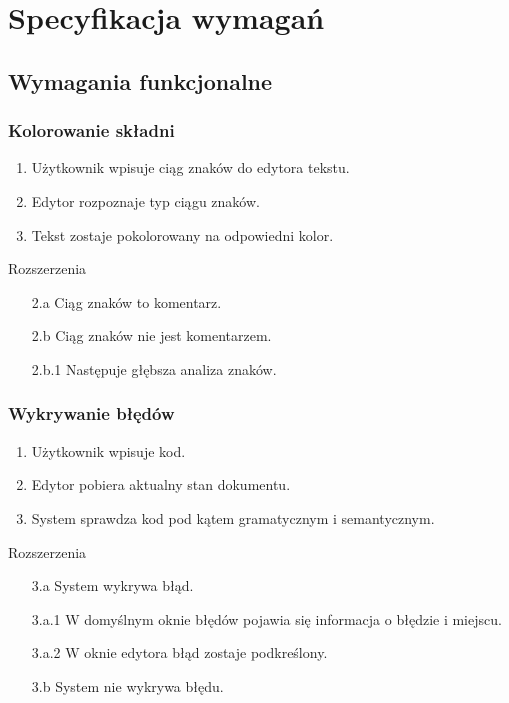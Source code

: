 \chapter{Specyfikacja wymagań}
\label{sec:specyfikacja}
\section{Wymagania funkcjonalne}
\subsection{Kolorowanie składni}
\begin{enumerate}
\item Użytkownik wpisuje ciąg znaków do edytora tekstu.
\item Edytor rozpoznaje typ ciągu znaków.
\item Tekst zostaje pokolorowany na odpowiedni kolor.
\end{enumerate}
Rozszerzenia
\begin{enumerate}
\item[2.a] Ciąg znaków to komentarz.
\item[2.b] Ciąg znaków nie jest komentarzem.
\item[2.b.1] Następuje głębsza analiza znaków.
\end{enumerate}
\subsection{Wykrywanie błędów}
\label{reqErrorDetection}
\begin{enumerate}
\item Użytkownik wpisuje kod.
\item Edytor pobiera aktualny stan dokumentu.
\item System sprawdza kod pod kątem gramatycznym i semantycznym.
\end{enumerate}
Rozszerzenia
\begin{enumerate}
\item[3.a] System wykrywa błąd. 
\item[3.a.1] W domyślnym oknie błędów pojawia się informacja o błędzie i miejscu.
\item[3.a.2] W oknie edytora błąd zostaje podkreślony.
\item[3.b] System nie wykrywa błędu.
\end{enumerate}
